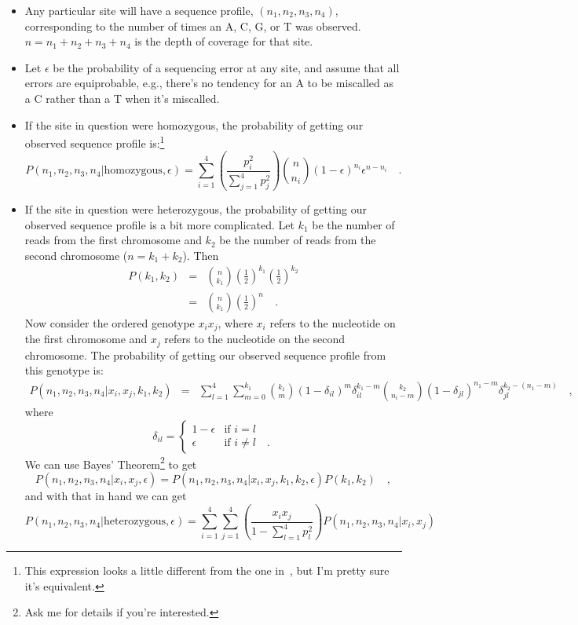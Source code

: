 \begin{itemize}

\item Any particular site will have a sequence profile, $(n_1, n_2,
  n_3, n_4)$, corresponding to the number of times an A, C, G, or T
  was observed. $n=n_1+n_2+n_3+n_4$ is the depth of coverage for that
  site. 

\item Let $\epsilon$ be the probability of a sequencing error at any
  site, and assume that all errors are equiprobable, e.g., there's no
  tendency for an A to be miscalled as a C rather than a T when it's
  miscalled. 

\item If the site in question were homozygous, the probability of
  getting our observed sequence profile is:\footnote{This expression
    looks a little different from the one in~\cite{Lynch-2008}, but
    I'm pretty sure it's equivalent.}
\[
P(n_1,n_2,n_3,n_4|\mbox{homozygous},\epsilon)
=
\sum_{i=1}^4 \left(\frac{p_i^2}{\sum_{j=1}^4p_j^2}\right) 
{n \choose n_i}(1-\epsilon)^{n_i}\epsilon^{n-n_i}
\quad .
\]

\item If the site in question were heterozygous, the probability of
  getting our observed sequence profile is a bit more complicated. Let
  $k_1$ be the number of reads from the first chromosome and $k_2$ be
  the number of reads from the second chromosome ($n=k_1+k_2$). Then
\begin{eqnarray*}
P(k_1,k_2)
&=&
{n \choose k_1}\left(\frac{1}{2}\right)^{k_1}
               \left(\frac{1}{2}\right)^{k_2}
\\
&=&
{n \choose k_1}\left(\frac{1}{2}\right)^n \quad .
\end{eqnarray*}
Now consider the ordered genotype $x_ix_j$, where $x_i$ refers to the
nucleotide on the first chromosome and $x_j$ refers to the nucleotide
on the second chromosome. The probability of getting our observed
sequence profile from this genotype is:
{\footnotesize
\begin{eqnarray*}
P(n_1,n_2,n_3,n_4|x_i,x_j,k_1,k_2)
&=&
\sum_{l=1}^4\sum_{m=0}^{k_1}{k_1 \choose m}(1-\delta_{il})^m\delta_{il}^{k_1-m}
{k_2 \choose n_i-m}(1-\delta_{jl})^{n_1-m}\delta_{jl}^{k_2-(n_1-m)}
\quad ,
\end{eqnarray*}
}
where 
\[
\delta_{il} = \left\{\begin{array}{ll}
1-\epsilon & \mbox{if } i = l \\
\epsilon & \mbox{if } i \ne l \quad .
\end{array}
\right.
\]
We can use Bayes' Theorem\footnote{Ask me for details if you're
  interested.} to get
\[
P(n_1,n_2,n_3,n_4|x_i,x_j,\epsilon) =
P(n_1,n_2,n_3,n_4|x_i,x_j,k_1,k_2,\epsilon)P(k_1,k_2) \quad ,
\]
and with that in hand we can get
\[
P(n_1,n_2,n_3,n_4|\mbox{heterozygous},\epsilon)
=
\sum_{i=1}^4\sum_{j=1}^4
\left(\frac{x_ix_j}{1-{\sum_{l=1}^4p_l^2}}\right) P(n_1,n_2,n_3,n_4|x_i,x_j) 
\]


\end{itemize}
